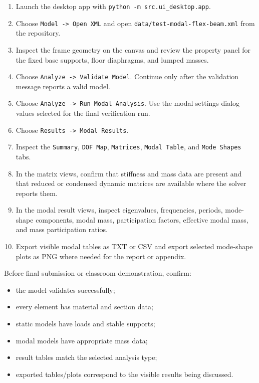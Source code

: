 \documentclass[11pt,a4paper]{article}
\begin{document}
\begin{enumerate}
\item Launch the desktop app with \texttt{python -m src.ui\_desktop.app}.
\item Choose \texttt{Model -> Open XML} and open \texttt{data/test-modal-flex-beam.xml} from the repository.
\item Inspect the frame geometry on the canvas and review the property panel for the fixed base supports, floor diaphragms, and lumped masses.
\item Choose \texttt{Analyze -> Validate Model}. Continue only after the validation message reports a valid model.
\item Choose \texttt{Analyze -> Run Modal Analysis}. Use the modal settings dialog values selected for the final verification run.
\item Choose \texttt{Results -> Modal Results}.
\item Inspect the \texttt{Summary}, \texttt{DOF Map}, \texttt{Matrices}, \texttt{Modal Table}, and \texttt{Mode Shapes} tabs.
\item In the matrix views, confirm that stiffness and mass data are present and that reduced or condensed dynamic matrices are available where the solver reports them.
\item In the modal result views, inspect eigenvalues, frequencies, periods, mode-shape components, modal mass, participation factors, effective modal mass, and mass participation ratios.
\item Export visible modal tables as TXT or CSV and export selected mode-shape plots as PNG where needed for the report or appendix.
\end{enumerate}

Before final submission or classroom demonstration, confirm:
\begin{itemize}
\item the model validates successfully;
\item every element has material and section data;
\item static models have loads and stable supports;
\item modal models have appropriate mass data;
\item result tables match the selected analysis type;
\item exported tables/plots correspond to the visible results being discussed.
\end{itemize}
\end{document}
